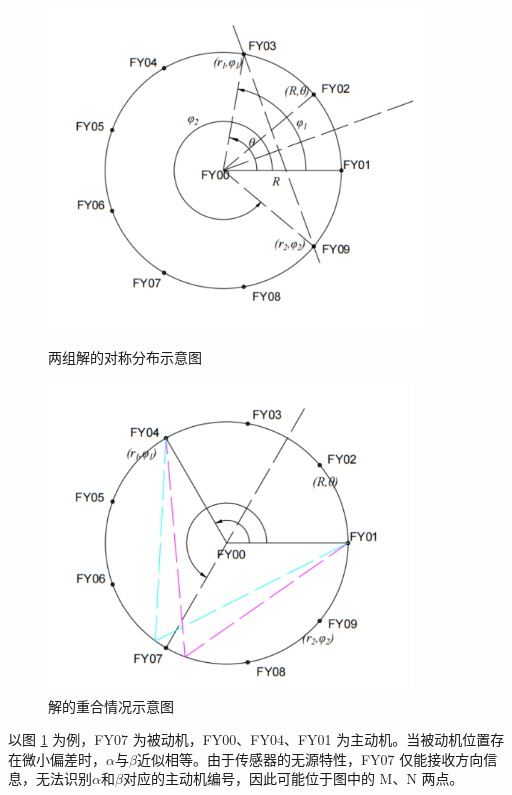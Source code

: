 \documentclass[withoutpreface,bwprint]{cumcmthesis} %
\begin{document}
\begin{figure}[H]
    \centering
    \begin{minipage}{0.49\textwidth}
        \centering
        \includegraphics[width=0.9\textwidth]{../../figure/q1_3.png} 
        \caption{两组解的对称分布示意图}
        \label{q1_3}
    \end{minipage}
    \begin{minipage}{0.49\textwidth}
        \centering
        \includegraphics[width=0.86\textwidth]{../../figure/q1_4.png} 
        \caption{解的重合情况示意图}
        \label{q1_4}   
    \end{minipage}
\end{figure}

以图 \ref{q1_4} 为例，FY07 为被动机，FY00、FY04、FY01 为主动机。当被动机位置存在微小偏差时，$\alpha$与$\beta$近似相等。由于传感器的无源特性，FY07 仅能接收方向信息，无法识别$\alpha$和$\beta$对应的主动机编号，因此可能位于图中的 M、N 两点。
\end{document}
